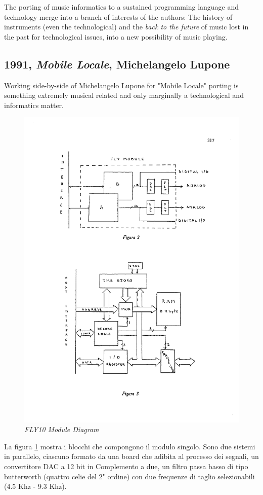 \documentclass[twoside,a4paper]{article}
\begin{document}
The porting of music informatics to a sustained programming language and technology merge into a branch of interests of the authors: The history of instruments (even the technological) and the \emph{back to the future} of music lost in the past for technological issues, into a new possibility of music playing. 


\subsection{1991, \emph{Mobile Locale}, Michelangelo Lupone}

Working side-by-side of Michelangelo Lupone for "Mobile Locale" porting is something extremely musical related and only marginally a technological and informatics matter. 

\begin{figure}[ht]
\centerline{\includegraphics[width=.45\textwidth]{img/lmfly10}}
\caption{\label{ml-fly10}{\it FLY10 Module Diagram}}
\end{figure}

La figura \ref{ml-fly10} mostra i blocchi che compongono il modulo singolo. Sono due sistemi in parallelo, ciascuno formato da una board che adibita al processo dei segnali, un convertitore DAC a 12 bit in Complemento a due, un filtro passa basso di tipo butterworth (quattro celie del 2" ordine) con due frequenze di taglio selezionabili (4.5 Khz - 9.3 Khz).
\end{document}
